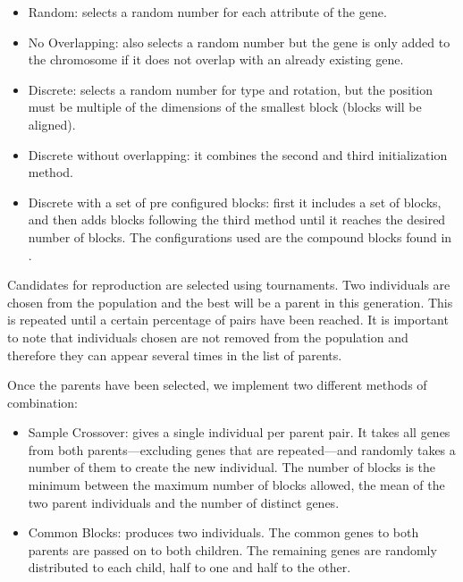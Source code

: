 \documentclass[sigconf]{acmart}
\begin{document}
\begin{itemize}
	\item Random: selects a random number for each attribute of the gene.
	\item No Overlapping: also selects a random number but the gene is only 
	added to the chromosome if it does not overlap with an already existing 
	gene.
	\item Discrete: selects a random number for type and rotation, but the 
	position must be multiple of the dimensions of the smallest block (blocks 
	will be aligned).
	\item Discrete without overlapping: it combines the second and third 
	initialization method.
	\item Discrete with a set of pre configured blocks: first it includes
	a set of blocks, and then adds blocks following the third method until
	it reaches the desired number of blocks. The configurations used are the
	compound blocks found in \cite{ferreira2014search}.
\end{itemize}

Candidates for reproduction are selected using tournaments. Two individuals are chosen from the 
population and the best will be a parent in this generation. This is 
repeated until a certain percentage of pairs have been reached. It is important 
to note that individuals chosen are not removed from the population and 
therefore they can appear several times in the list of parents. 

Once the parents have been selected, we implement two different methods of 
combination:
\begin{itemize}
	\item Sample Crossover: gives a single individual per parent pair. It takes 
	all genes from both parents---excluding genes that are repeated---and 
	randomly takes a number of them to create the new individual. The number of 
	blocks is the minimum between the maximum number of blocks allowed, the 
	mean of the two parent individuals and the number of distinct genes.
	\item Common Blocks: produces two individuals. The common genes to both 
	parents are passed on to both children. The remaining genes are randomly 
	distributed to each child, half to one and half to the other. 
	\label{ga:cross2}
\end{itemize}
\end{document}
